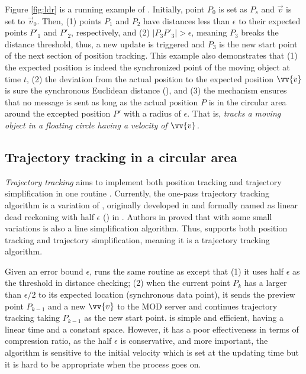 \begin{example}
	\label{exm-ldr}
Figure \ref{fig:ldr} is a running example of \ldr.
Initially, point $P_0$ is set as $P_s$ and $\vec{v}$ is set to $\vec{v}_0$. Then, (1) points $P_1$ and $P_2$ have \sed distances less than $\epsilon$ to their expected points $P'_1$ and $P'_2$, respectively, and (2) $|P_3P'_3| > \epsilon$, meaning $P_3$ breaks the distance threshold, thus, a new update is triggered and $P_3$ is the new start point of the next section of position tracking.
%
This example also demonstrates that (1) the expected position is indeed the synchronized point of the moving object at time $t$, (2) the deviation from the actual position to the expected position \wrt $\vv{v}$ is sure the synchronous Euclidean distance (\sed), and (3) the \ldr mechanism ensures that no message is sent as long as the actual position $P$ is in the circular area around the excepted position $P'$ with a radius of $\epsilon$. That is, \emph{\ldr tracks a moving object in a floating circle having a velocity of $\vv{v}$.}
\end{example}


 




\subsection{Trajectory tracking in a circular area}
\textit{Trajectory tracking} aims to implement both position tracking and trajectory simplification in one routine \cite{Lange:Tracking}. Currently, the one-pass trajectory tracking algorithm is a variation of \ldr, originally developed in \cite{Trajcevski:LDRH} and formally named as linear dead reckoning with half $\epsilon$ (\ldrh) in \cite{Lange:Tracking}.
%
Authors in \cite{Trajcevski:LDRH} proved that \ldr with some small variations is also a line simplification algorithm. Thus, \ldrh supports both position tracking and trajectory simplification, meaning it is a trajectory tracking algorithm.

Given an error bound $\epsilon$, \ldrh runs the same routine as \ldr except that (1) it uses half $\epsilon$ as the threshold in distance checking; (2) when the current point $P_k$ has a \sed larger than $\epsilon/2$ to its expected location (synchronous data point), it sends the preview point $P_{k-1}$ and a new $\vv{v}$ to the MOD server and continues trajectory tracking taking $P_{k-1}$ as the new start point. \ldrh is simple and efficient, having a linear time and a constant space. However, it has a poor effectiveness in terms of compression ratio, as the half $\epsilon$ is conservative, and more important, the algorithm is sensitive to the initial velocity which is set at the updating time but it is hard to be appropriate when the process goes on.

